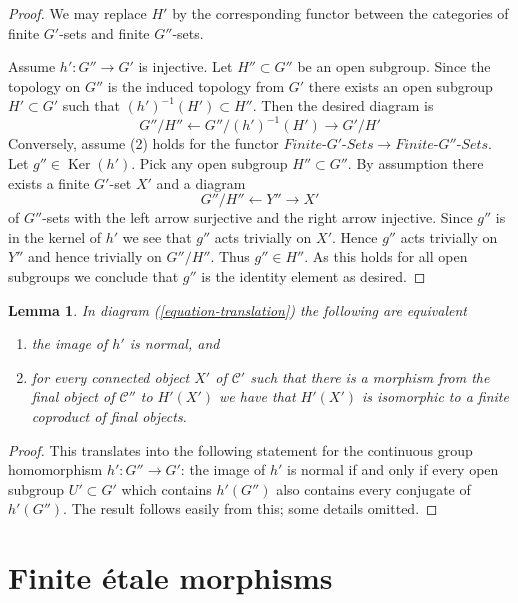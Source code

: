 \documentclass{stacks-project}
\theoremstyle{plain}
\newtheorem{lemma}[subsection]{Lemma}
\theoremstyle{definition}
\theoremstyle{remark}
\numberwithin{equation}{subsection}
\def\Ker{\mathop{\mathrm{Ker}}}
\begin{document}
\begin{proof}
We may replace $H'$ by the corresponding functor between the categories
of finite $G'$-sets and finite $G''$-sets.

\medskip\noindent
Assume $h' : G'' \to G'$ is injective. Let $H'' \subset G''$
be an open subgroup. Since the topology on $G''$ is the induced
topology from $G'$ there exists an open subgroup $H' \subset G'$
such that $(h')^{-1}(H') \subset H''$.
Then the desired diagram is
$$
G''/H'' \leftarrow G''/(h')^{-1}(H') \rightarrow G'/H'
$$
Conversely, assume (2) holds for the functor
$\textit{Finite-}G'\textit{-Sets} \to \textit{Finite-}G''\textit{-Sets}$.
Let $g'' \in \Ker(h')$. Pick any open subgroup $H'' \subset G''$.
By assumption there exists a finite $G'$-set $X'$ and a diagram
$$
G''/H'' \leftarrow Y'' \rightarrow X'
$$
of $G''$-sets with the left arrow surjective and the right arrow injective.
Since $g''$ is in the kernel of $h'$ we see that $g''$ acts trivially on $X'$.
Hence $g''$ acts trivially on $Y''$ and hence trivially on $G''/H''$.
Thus $g'' \in H''$. As this holds for all open subgroups we conclude
that $g''$ is the identity element as desired.
\end{proof}

\begin{lemma}
\label{lemma-functoriality-galois-normal}
In diagram (\ref{equation-translation}) the following are equivalent
\begin{enumerate}
\item the image of $h'$ is normal, and
\item for every connected object $X'$ of $\mathcal{C}'$ such that
there is a morphism from the final object of $\mathcal{C}''$
to $H'(X')$ we have that $H'(X')$ is isomorphic to a finite coproduct
of final objects.
\end{enumerate}
\end{lemma}

\begin{proof}
This translates into the following statement for the continuous
group homomorphism $h' : G'' \to G'$: the image of $h'$ is normal
if and only if every open subgroup $U' \subset G'$ which
contains $h'(G'')$ also contains every conjugate of $h'(G'')$.
The result follows easily from this; some details omitted.
\end{proof}






\section{Finite \'etale morphisms}
\label{section-finite-etale}
\end{document}
